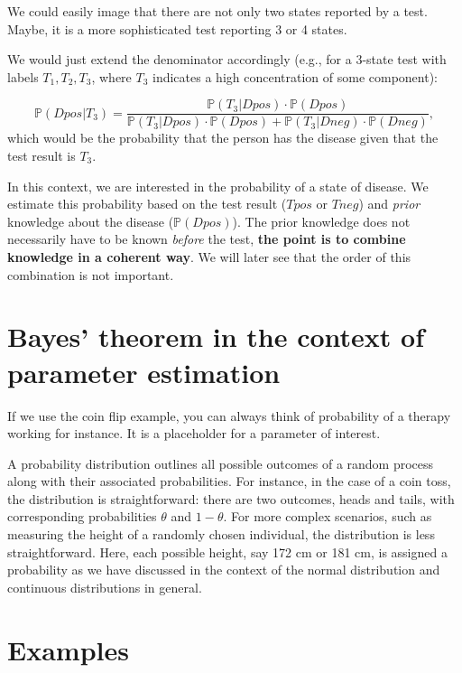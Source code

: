 \documentclass[
]{book}
\begin{document}
We could easily image that there are not only two states reported by a test. Maybe, it is a more sophisticated test reporting 3 or 4 states.

We would just extend the denominator accordingly
(e.g., for a 3-state test with labels \(T_1, T_2, T_3\), where \(T_3\) indicates a high concentration of some component):

\[
\mathbb{P}(Dpos|T_3) = \frac{\mathbb{P}(T_3|Dpos) \cdot 
\mathbb{P}(Dpos)}{\mathbb{P}(T_3|Dpos) \cdot \mathbb{P}(Dpos) + \mathbb{P}(T_3|Dneg) \cdot \mathbb{P}(Dneg)},
\]
which would be the probability that the person has the disease given that the test result is \(T_3\).

In this context, we are interested in the probability of a state of disease.
We estimate this probability based on the test result (\(Tpos\) or \(Tneg\)) and \emph{prior} knowledge about the disease (\(\mathbb{P}(Dpos)\)).
The prior knowledge does not necessarily have to be known \emph{before} the test, \textbf{the point is to combine knowledge in a coherent way}. We will
later see that the order of this combination is not important.

\section{Bayes' theorem in the context of parameter estimation}\label{bayes-theorem-in-the-context-of-parameter-estimation}

If we use the coin flip example, you can always think of probability of a therapy working for instance.
It is a placeholder for a parameter of interest.

A probability distribution outlines all possible outcomes of a random process along with their associated probabilities.
For instance, in the case of a coin toss, the distribution is straightforward: there are two outcomes,
heads and tails, with corresponding probabilities \(\theta\) and \(1-\theta\).
For more complex scenarios, such as measuring the height of a randomly chosen individual,
the distribution is less straightforward. Here, each possible height, say 172 cm or 181 cm,
is assigned a probability as we have discussed in the context of the normal distribution and continuous distributions
in general.

\section{Examples}\label{examples}
\end{document}

